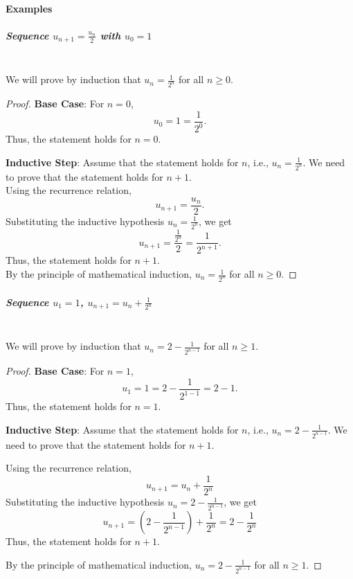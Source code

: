 \documentclass[]{article}
\begin{document}
	\paragraph{Examples}
	\subparagraph{Sequence $u_{n+1} = \frac{u_n}{2}$ with $u_0 = 1$}
	\noindent\\
	We will prove by induction that $u_n = \frac{1}{2^n}$ for all $n \geq 0$.
	\begin{proof}
		\textbf{Base Case}:
		For $n = 0$,
		$$
		u_0 = 1 = \frac{1}{2^0}.
		$$
		Thus, the statement holds for $n = 0$.
		
		\textbf{Inductive Step}:
		Assume that the statement holds for $n$, i.e., $u_n = \frac{1}{2^n}$.
		We need to prove that the statement holds for $n + 1$.\\
		Using the recurrence relation,
		$$
		u_{n+1} = \frac{u_n}{2}.
		$$
		Substituting the inductive hypothesis $u_n = \frac{1}{2^n}$, we get
		$$
		u_{n+1} = \frac{\frac{1}{2^n}}{2} = \frac{1}{2^{n+1}}.
		$$
		Thus, the statement holds for $n + 1$.\\
		By the principle of mathematical induction, $u_n = \frac{1}{2^n}$ for all $n \geq 0$.
	\end{proof}
	
	\subparagraph*{Sequence $u_1 = 1$, $u_{n+1} = u_n + \frac{1}{2^n}$}
	\noindent\\
	We will prove by induction that $u_n = 2 - \frac{1}{2^{n-1}}$ for all $n \geq 1$.
	\begin{proof}
		\textbf{Base Case}:
		For $n = 1$,
		$$
		u_1 = 1 = 2 - \frac{1}{2^{1-1}} = 2 - 1.
		$$
		Thus, the statement holds for $n = 1$.
		
		\textbf{Inductive Step}:
		Assume that the statement holds for $n$, i.e., $u_n = 2 - \frac{1}{2^{n-1}}$.
		We need to prove that the statement holds for $n + 1$.
		
		Using the recurrence relation,
		$$ u_{n+1} = u_n + \frac{1}{2^n} $$
		Substituting the inductive hypothesis $u_n = 2 - \frac{1}{2^{n-1}}$, we get
		$$ u_{n+1} = \left(2 - \frac{1}{2^{n-1}}\right) + \frac{1}{2^n} = 2 - \frac{1}{2^n} $$
		Thus, the statement holds for $n + 1$.
		
		By the principle of mathematical induction, $u_n = 2 - \frac{1}{2^{n-1}}$ for all $n \geq 1$.
	\end{proof}
	
\end{document}
